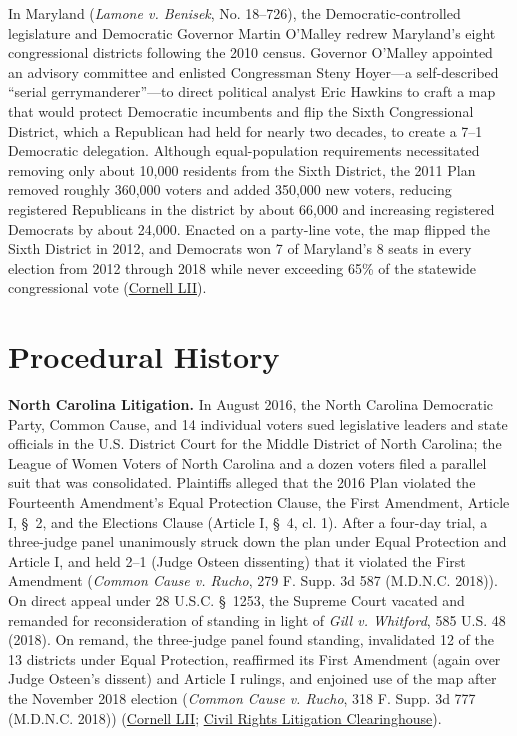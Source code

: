 \documentclass[12pt]{article}
\begin{document}
In Maryland (\textit{Lamone v. Benisek}, No. 18--726), the Democratic-controlled legislature and Democratic Governor Martin O'Malley redrew Maryland's eight congressional districts following the 2010 census. Governor O'Malley appointed an advisory committee and enlisted Congressman Steny Hoyer---a self-described ``serial gerrymanderer''---to direct political analyst Eric Hawkins to craft a map that would protect Democratic incumbents and flip the Sixth Congressional District, which a Republican had held for nearly two decades, to create a 7--1 Democratic delegation. Although equal-population requirements necessitated removing only about 10,000 residents from the Sixth District, the 2011 Plan removed roughly 360,000 voters and added 350,000 new voters, reducing registered Republicans in the district by about 66,000 and increasing registered Democrats by about 24,000. Enacted on a party-line vote, the map flipped the Sixth District in 2012, and Democrats won 7 of Maryland's 8 seats in every election from 2012 through 2018 while never exceeding 65\% of the statewide congressional vote (\href{https://www.law.cornell.edu/supremecourt/text/18-422}{Cornell LII}).

\section{Procedural History}

\textbf{North Carolina Litigation.} In August 2016, the North Carolina Democratic Party, Common Cause, and 14 individual voters sued legislative leaders and state officials in the U.S. District Court for the Middle District of North Carolina; the League of Women Voters of North Carolina and a dozen voters filed a parallel suit that was consolidated. Plaintiffs alleged that the 2016 Plan violated the Fourteenth Amendment's Equal Protection Clause, the First Amendment, Article I, \S~2, and the Elections Clause (Article I, \S~4, cl. 1). After a four-day trial, a three-judge panel unanimously struck down the plan under Equal Protection and Article I, and held 2--1 (Judge Osteen dissenting) that it violated the First Amendment (\textit{Common Cause v. Rucho}, 279 F. Supp. 3d 587 (M.D.N.C. 2018)). On direct appeal under 28 U.S.C. \S~1253, the Supreme Court vacated and remanded for reconsideration of standing in light of \textit{Gill v. Whitford}, 585 U.S. 48 (2018). On remand, the three-judge panel found standing, invalidated 12 of the 13 districts under Equal Protection, reaffirmed its First Amendment (again over Judge Osteen's dissent) and Article I rulings, and enjoined use of the map after the November 2018 election (\textit{Common Cause v. Rucho}, 318 F. Supp. 3d 777 (M.D.N.C. 2018)) (\href{https://www.law.cornell.edu/supremecourt/text/18-422}{Cornell LII}; \href{https://clearinghouse.net/case/43526/}{Civil Rights Litigation Clearinghouse}).
\end{document}
